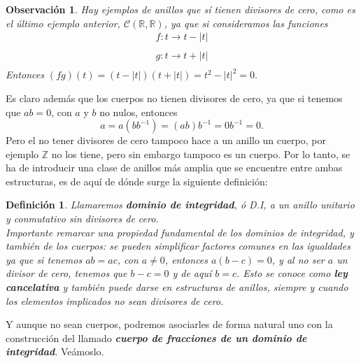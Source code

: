\documentclass[12pt]{article}
\newtheorem{definition}[theorem]{Definición}
\newtheorem{observation}{Observación}[theorem]
\providecommand{\abs}[1]{\lvert#1\rvert}
\begin{document}
\begin{observation}Hay ejemplos de anillos que sí tienen divisores de cero, como es el último ejemplo anterior, $\mathcal{C}(\mathbb{R}, \mathbb{R})$, ya que si consideramos las funciones $$\begin{array}{rccl}
f \colon t \longrightarrow t - \abs{t} \\
\end{array}
$$
$$\begin{array}{rccl}
g \colon t \longrightarrow t + \abs{t} \\
\end{array}
$$ Entonces $(fg)(t) = (t - \abs{t})(t + \abs{t}) = t^{2} -\abs{t}^{2} = 0.$
\end{observation}

Es claro además que los cuerpos no tienen divisores de cero, ya que si tenemos que $ab =0 $, con $a$ y $b$ no nulos, entonces $$a = a(bb^{-1}) = (ab)b^{-1} = 0b^{-1} = 0.$$ Pero el no tener divisores de cero tampoco hace a un anillo un cuerpo, por ejemplo $\mathbb{Z}$ no los tiene, pero sin embargo tampoco es un cuerpo. Por lo tanto, se ha de introducir una clase de anillos más amplia que se encuentre entre ambas estructuras, es de aquí de dónde surge la siguiente definición:

\begin{definition} Llamaremos \textbf{dominio de integridad}, ó D.I, a un anillo unitario y conmutativo sin divisores de cero.\vspace{0.2cm}\\
Importante remarcar una propiedad fundamental de los dominios de integridad, y también de los cuerpos: se pueden simplificar factores comunes en las igualdades ya que si tenemos $ab = ac$, con $a \neq 0$, entonces $a(b-c) = 0$, y al no ser $a$ un divisor de cero, tenemos que $b-c = 0$ y de aquí $b = c$. Esto se conoce como \textbf{ley cancelativa} y también puede darse en estructuras de anillos, siempre y cuando los elementos implicados no sean divisores de cero. 
\end{definition}

Y aunque no sean cuerpos, podremos asociarles de forma natural uno con la construcción del llamado \textbf{\textit{cuerpo de fracciones de un dominio de integridad}}. Veámoslo.
\end{document}
